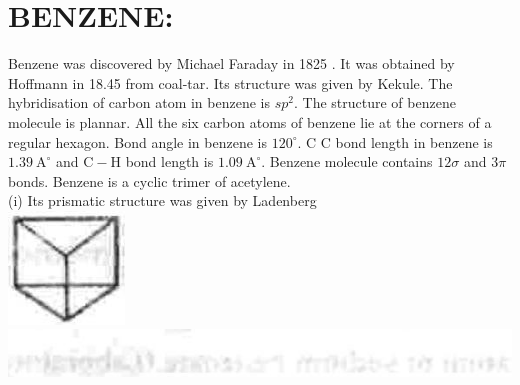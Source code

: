 \documentclass[10pt]{article}
\begin{document}
\section*{BENZENE:}
Benzene was discovered by Michael Faraday in 1825 . It was obtained by Hoffmann in 18.45 from coal-tar. Its structure was given by Kekule. The hybridisation of carbon atom in benzene is $s p^{2}$. The structure of benzene molecule is plannar. All the six carbon atoms of benzene lie at the corners of a regular hexagon. Bond angle in benzene is $120^{\circ}$. C C bond length in benzene is $1.39 \mathrm{~A}^{\circ}$ and $\mathrm{C}-\mathrm{H}$ bond length is $1.09 \mathrm{~A}^{\circ}$. Benzene molecule contains $12 \sigma$ and $3 \pi$ bonds. Benzene is a cyclic trimer of acetylene.\\
(i) Its prismatic structure was given by Ladenberg\\
\includegraphics[max width=\textwidth, center]{2025_01_28_8470952b98110cec3aabg-203}\\
\includegraphics[max width=\textwidth, center]{2025_01_28_8470952b98110cec3aabg-203(1)}
\end{document}
